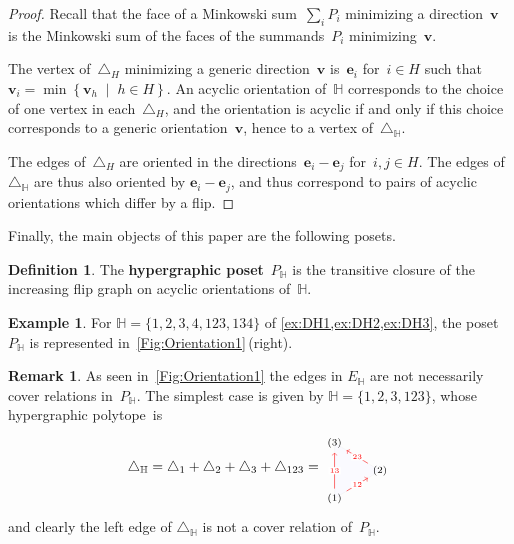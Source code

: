 \documentclass[reqno]{amsart}
\theoremstyle{definition}
\newtheorem{definition}[theorem]{Definition}
\newtheorem{example}[theorem]{Example}
\newtheorem{remark}[theorem]{Remark}
\renewcommand{\b}[1]{\boldsymbol{#1}} %
\newcommand{\set}[2]{\left\{ #1 \;\middle|\; #2 \right\}} %
\newcommand{\simplex}{\triangle} %
\newcommand{\defn}[1]{\textbf{\textsf{\color{PineGreen} #1}}} %
\newcommand{\HH}{\mathbb H}  %
\begin{document}
\begin{proof}
Recall that the face of a Minkowski sum~$\sum_i P_i$ minimizing a direction~$\b{v}$ is the Minkowski sum of the faces of the summands~$P_i$ minimizing~$\b{v}$.

The vertex of~$\simplex_H$ minimizing a generic direction~$\b{v}$ is~$\b{e}_i$ for~$i \in H$ such that~$\b{v}_i = \min\set{\b{v}_h}{h \in H}$.
An acyclic orientation of~$\HH$ corresponds to the choice of one vertex in each~$\simplex_H$, and the orientation is acyclic if and only if this choice corresponds to a generic orientation~$\b{v}$, hence to a vertex of~$\simplex_\HH$.

The edges of~$\simplex_H$ are oriented in the directions~$\b{e}_i-\b{e}_j$ for~$i,j \in H$.
The edges of~$\simplex_\HH$ are thus also oriented by $\b{e}_i-\b{e}_j$, and thus correspond to pairs of acyclic orientations which differ by a flip.
\end{proof}

Finally, the main objects of this paper are the following posets.

\begin{definition}
The \defn{hypergraphic poset}~$P_\HH$ is the transitive closure of the increasing flip graph on acyclic orientations of~$\HH$.
\end{definition}

\begin{example}
\label{ex:DH4}
For $\HH=\{ 1, 2, 3, 4, 123, 134 \}$ of \cref{ex:DH1,ex:DH2,ex:DH3}, the poset  $P_\HH$ is represented in~\cref{Fig:Orientation1}\,(right).
\end{example}

\begin{remark}
\label{rem:edgeNotCover}
As seen in~\cref{Fig:Orientation1} the edges in $E_\HH$ are not necessarily cover relations in~$P_\HH$.
The simplest case is given by
$\HH=\{ 1, 2, 3, 123 \}$, 
whose hypergraphic polytope~is
\[
	\simplex_\HH = \simplex_1 + \simplex_2 + \simplex_3 + \simplex_{123} =
	\begin{tikzpicture}[scale=.7,baseline=.0cm]
		\draw [color=gray!10,fill=blue!2] (0,-1)--(0,1)--(1.632,0)--(0,-1) ; 
		\node (a) at (0,-1) {$\scriptstyle (1)$};
		\node (b) at (1.632,0) {$\scriptstyle (2)$};
		\node (c) at (0,1) {$\scriptstyle (3)$};
		\path[color=red, ->] (a) edge node[fill=white,inner sep=1pt, font=\tiny ] {$ \scriptscriptstyle 13 $} (c);
		\path[color=red, ->] (a) edge node[fill=white,inner sep=1pt, font=\tiny ] {$\scriptscriptstyle  12 $} (b);
		\path[color=red, ->] (b) edge node[fill=white,inner sep=1pt, font=\tiny ] {$ \scriptscriptstyle 23 $} (c);
	\end{tikzpicture}
\]
and clearly the left edge of $\simplex_\HH$ is not a cover relation of~$P_\HH$.
\end{remark}
\end{document}
